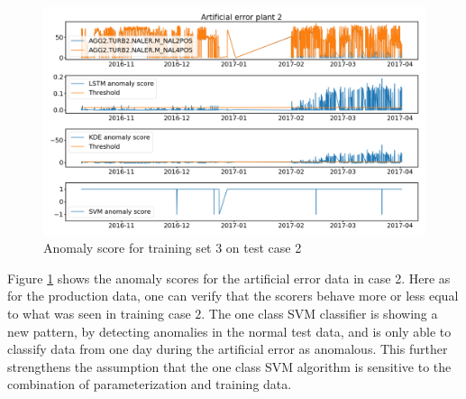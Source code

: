         \begin{figure}[h!]
            \centering
            \includegraphics[width=\textwidth]{report/figures/analysis/plant2_train_long/artificial_data_anomaly.png}
            \caption{Anomaly score for training set 3 on test case 2}
            \label{fig:plan3_long_arti_anomaly_score}
        \end{figure}
        Figure \ref{fig:plan3_long_arti_anomaly_score} shows the anomaly scores for the artificial error data in case 2. Here as for the production data, one can verify that the scorers behave more or less equal to what was seen in training case $2$. The one class SVM classifier is showing a new pattern, by detecting anomalies in the normal test data, and is only able to classify data from one day during the artificial error as anomalous. This further strengthens the assumption that the one class SVM algorithm is sensitive to the combination of parameterization and training data. 
    
